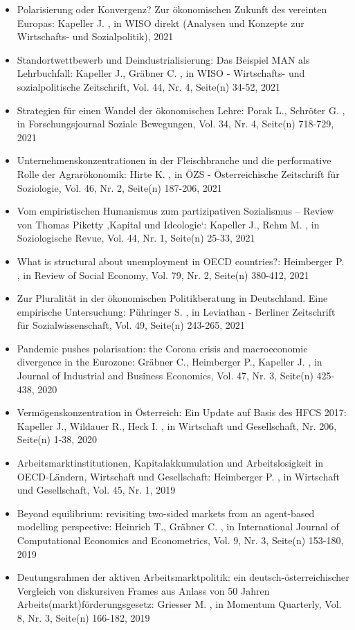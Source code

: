 \begin{itemize}
\item Polarisierung oder Konvergenz? Zur ökonomischen Zukunft des vereinten Europas: Kapeller J. , in WISO direkt (Analysen und Konzepte zur Wirtschafts- und Sozialpolitik), 2021
\item Standortwettbewerb und Deindustrialisierung: Das Beispiel MAN als Lehrbuchfall: Kapeller J., Gräbner C. , in WISO - Wirtschafts- und sozialpolitische Zeitschrift, Vol. 44, Nr. 4, Seite(n) 34-52, 2021
\item Strategien für einen Wandel der ökonomischen Lehre: Porak L., Schröter G. , in Forschungsjournal Soziale Bewegungen, Vol. 34, Nr. 4, Seite(n) 718-729, 2021
\item Unternehmenskonzentrationen in der Fleischbranche und die performative Rolle der Agrarökonomik: Hirte K. , in ÖZS - Österreichische Zeitschrift für Soziologie, Vol. 46, Nr. 2, Seite(n) 187-206, 2021
\item Vom empiristischen Humanismus zum partizipativen Sozialismus – Review von Thomas Piketty ‚Kapital und Ideologie‘: Kapeller J., Rehm M. , in Soziologische Revue, Vol. 44, Nr. 1, Seite(n) 25-33, 2021
\item What is structural about unemployment in OECD countries?: Heimberger P. , in Review of Social Economy, Vol. 79, Nr. 2, Seite(n) 380-412, 2021
\item Zur Pluralität in der ökonomischen Politikberatung in Deutschland. Eine empirische Untersuchung: Pühringer S. , in Leviathan - Berliner Zeitschrift für Sozialwissenschaft, Vol. 49, Seite(n) 243-265, 2021
\item Pandemic pushes polarisation: the Corona crisis and macroeconomic divergence in the Eurozone: Gräbner C., Heimberger P., Kapeller J. , in Journal of Industrial and Business Economics, Vol. 47, Nr. 3, Seite(n) 425-438, 2020
\item Vermögenskonzentration in Österreich: Ein Update auf Basis des HFCS 2017: Kapeller J., Wildauer R., Heck I. , in Wirtschaft und Gesellschaft, Nr. 206, Seite(n) 1-38, 2020
\item Arbeitsmarktinstitutionen, Kapitalakkumulation und Arbeitslosigkeit in OECD-Ländern, Wirtschaft und Gesellschaft: Heimberger P. , in Wirtschaft und Gesellschaft, Vol. 45, Nr. 1, 2019
\item Beyond equilibrium: revisiting two-sided markets from an agent-based modelling perspective: Heinrich T., Gräbner C. , in International Journal of Computational Economics and Econometrics, Vol. 9, Nr. 3, Seite(n) 153-180, 2019
\item Deutungsrahmen der aktiven Arbeitsmarktpolitik: ein deutsch-österreichischer Vergleich von diskursiven Frames aus Anlass von 50 Jahren Arbeits(markt)förderungsgesetz: Griesser M. , in Momentum Quarterly, Vol. 8, Nr. 3, Seite(n) 166-182, 2019

\end{itemize}
